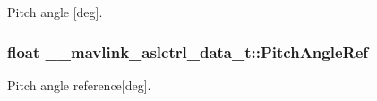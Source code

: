 Pitch angle \mbox{[}deg\mbox{]}. 

\hypertarget{struct____mavlink__aslctrl__data__t_a95c3dd65b47ca1e9aa9cff522e3b229d}{
\subsubsection[{Pitch\+Angle\+Ref}]{\setlength{\rightskip}{0pt plus 5cm}float \+\_\+\+\_\+mavlink\+\_\+aslctrl\+\_\+data\+\_\+t\+::\+Pitch\+Angle\+Ref}}\label{struct____mavlink__aslctrl__data__t_a95c3dd65b47ca1e9aa9cff522e3b229d}


Pitch angle reference\mbox{[}deg\mbox{]}. 

